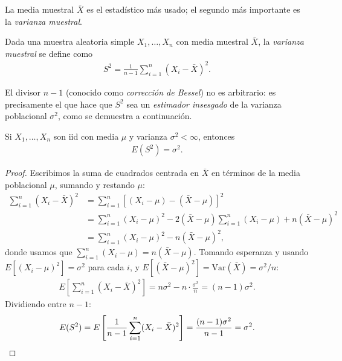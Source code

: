 La media muestral $\bar{X}$ es el estad\'istico m\'as usado; el segundo m\'as
importante es la \emph{varianza muestral}.

\begin{definicion}
 \label{eq:5.1.1}
Dada una muestra aleatoria simple $X_1, \ldots, X_n$ con media muestral $\bar{X}$, la
\emph{varianza muestral} se define como
\begin{align}
 S^2 = \frac{1}{n-1}\sum_{i=1}^n (X_i - \bar{X})^2.
\end{align}
\end{definicion}

\begin{observacion}
El divisor $n-1$ (conocido como \emph{correcci\'on de Bessel}) no es arbitrario: es
precisamente el que hace que $S^2$ sea un \emph{estimador insesgado} de la varianza
poblacional $\sigma^2$, como se demuestra a continuaci\'on.
\end{observacion}

\begin{teorema}
 \label{eq:5.1.2}
Si $X_1, \ldots, X_n$ son iid con media $\mu$ y varianza $\sigma^2 < \infty$, entonces
\begin{align}
 E(S^2) = \sigma^2.
\end{align}
\end{teorema}

\begin{proof}
Escribimos la suma de cuadrados centrada en $\bar{X}$ en t\'erminos de la media
poblacional $\mu$, sumando y restando $\mu$:
\begin{align}
 \sum_{i=1}^n (X_i - \bar{X})^2
 &= \sum_{i=1}^n \left[(X_i - \mu) - (\bar{X} - \mu)\right]^2 \\
 &= \sum_{i=1}^n (X_i - \mu)^2 - 2(\bar{X}-\mu)\sum_{i=1}^n(X_i-\mu) + n(\bar{X}-\mu)^2 \\
 &= \sum_{i=1}^n (X_i - \mu)^2 - n(\bar{X}-\mu)^2,
\end{align}
donde usamos que $\sum_{i=1}^n (X_i - \mu) = n(\bar{X}-\mu)$. Tomando esperanza y
usando $E[(X_i-\mu)^2] = \sigma^2$ para cada $i$, y
$E[(\bar{X}-\mu)^2] = \text{Var}(\bar{X}) = \sigma^2/n$:
\begin{align}
 E\left[\sum_{i=1}^n (X_i - \bar{X})^2\right] = n\sigma^2 - n\cdot\frac{\sigma^2}{n}
 = (n-1)\sigma^2.
\end{align}
Dividiendo entre $n-1$:
\begin{align}
 E(S^2) = E\left[\frac{1}{n-1}\sum_{i=1}^n (X_i - \bar{X})^2\right]
 = \frac{(n-1)\sigma^2}{n-1} = \sigma^2. \qedhere
\end{align}
\end{proof}


